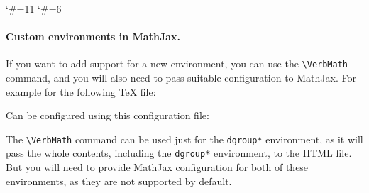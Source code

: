 \begin{texsource}
\catcode`\#=11
\catcode`\#=6

\EndPreamble
\end{texsource}

\paragraph{Custom environments in MathJax.}\label{sec:mathjax_env}

If you want to add support for a new environment, you can use the \verb|\VerbMath| command, and you will
also need to pass suitable configuration to MathJax. For example for the following TeX file:


Can be configured using this configuration file:

\begin{texsource}
 
\EndPreamble
\end{texsource}

The \verb|\VerbMath| command can be used just for the \verb|dgroup*| environment, as it will pass the
whole contents, including the \verb|dgroup*| environment, to the HTML file. But you will need to 
provide MathJax configuration for both of these environments, as they are not supported by default.


